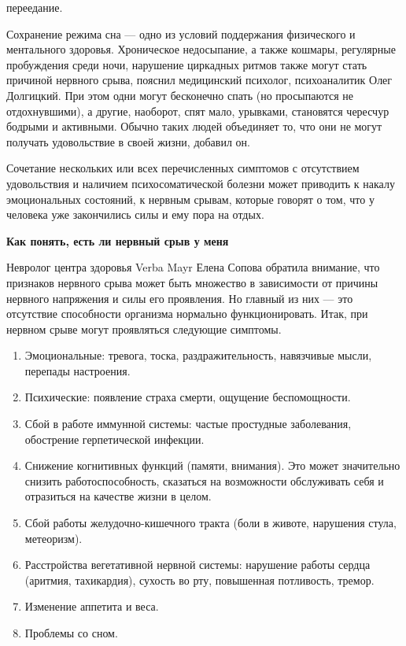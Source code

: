 переедание.

Сохранение режима сна — одно из условий поддержания физического и ментального здоровья. Хроническое недосыпание, а также кошмары, регулярные пробуждения среди ночи, нарушение циркадных ритмов также могут стать причиной нервного срыва, пояснил медицинский психолог, психоаналитик Олег Долгицкий. При этом одни могут бесконечно спать (но просыпаются не отдохнувшими), а другие, наоборот, спят мало, урывками, становятся чересчур бодрыми и активными. Обычно таких людей объединяет то, что они не могут получать удовольствие в своей жизни, добавил он.

Сочетание нескольких или всех перечисленных симптомов с отсутствием удовольствия и наличием психосоматической болезни может приводить к накалу эмоциональных состояний, к нервным срывам, которые говорят о том, что у человека уже закончились силы и ему пора на отдых.


\textbf{Как понять, есть ли нервный срыв у меня}

Невролог центра здоровья Verba Mayr Елена Сопова обратила внимание, что признаков нервного срыва может быть множество в зависимости от причины нервного напряжения и силы его проявления. Но главный из них — это отсутствие способности организма нормально функционировать. Итак, при нервном срыве могут проявляться следующие симптомы.

\begin{enumerate}
    \item Эмоциональные: тревога, тоска, раздражительность, навязчивые мысли, перепады настроения.
    \item Психические: появление страха смерти, ощущение беспомощности.
    \item Сбой в работе иммунной системы: частые простудные заболевания, обострение герпетической инфекции.
    \item Снижение когнитивных функций (памяти, внимания). Это может значительно снизить работоспособность, сказаться на возможности обслуживать себя и отразиться на качестве жизни в целом.
    \item Сбой работы желудочно-кишечного тракта (боли в животе, нарушения стула, метеоризм).
    \item Расстройства вегетативной нервной системы: нарушение работы сердца (аритмия, тахикардия), сухость во рту, повышенная потливость, тремор.
    \item Изменение аппетита и веса.
    \item Проблемы со сном.
\end{enumerate}

